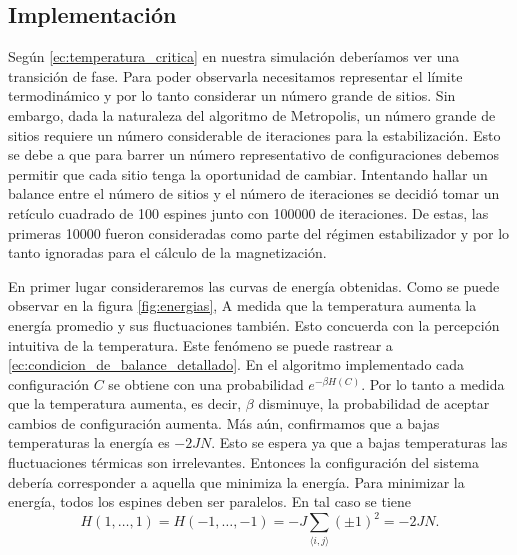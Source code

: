 \documentclass{article}
\begin{document}
\subsection{Implementación}

Según \eqref{ec:temperatura_critica} en nuestra simulación deberíamos ver una transición de fase. Para poder observarla necesitamos representar el límite termodinámico y por lo tanto considerar un número grande de sitios. Sin embargo, dada la naturaleza del algoritmo de Metropolis, un número grande de sitios requiere un número considerable de iteraciones para la estabilización. Esto se debe a que para barrer un número representativo de configuraciones debemos permitir que cada sitio tenga la oportunidad de cambiar. Intentando hallar un balance entre el número de sitios y el número de iteraciones se decidió tomar un retículo cuadrado de 100 espines junto con 100000 de iteraciones. De estas, las primeras 10000 fueron consideradas como parte del régimen estabilizador y por lo tanto ignoradas para el cálculo de la magnetización.

En primer lugar consideraremos las curvas de energía obtenidas. Como se puede observar en la figura \ref{fig:energias}, A medida que la temperatura aumenta la energía promedio y sus fluctuaciones también. Esto concuerda con la percepción intuitiva de la temperatura. Este fenómeno se puede rastrear a \eqref{ec:condicion_de_balance_detallado}. En el algoritmo implementado cada configuración $C$ se obtiene con una probabilidad $e^{-\beta H(C)}$. Por lo tanto a medida que la temperatura aumenta, es decir, $\beta$ disminuye, la probabilidad de aceptar cambios de configuración aumenta. Más aún, confirmamos que a bajas temperaturas la energía es $-2JN$. Esto se espera ya que a bajas temperaturas las fluctuaciones térmicas son irrelevantes. Entonces la configuración del sistema debería corresponder a aquella que minimiza la energía. Para minimizar la energía, todos los espines deben ser paralelos. En tal caso se tiene
\begin{equation}
H(1,\dots,1)=H(-1,\dots,-1)=-J\sum_{\langle i,j\rangle}(\pm 1)^2=-2JN.
\end{equation}
\end{document}
